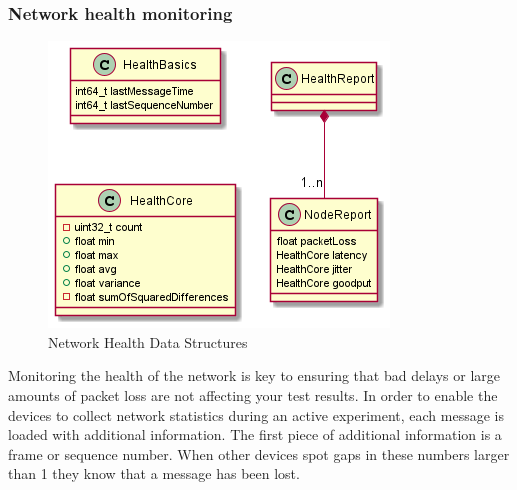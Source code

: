 \documentclass[letterpaper,twocolumn,12pt]{article}
\begin{document}
\subsubsection{Network health monitoring}\label{sec:nethealth}
\begin{figure}[]
    \centering
    \includegraphics[width=\linewidth]{out/images/network_health/network_health.png}
    \caption{Network Health Data Structures}
    \label{fig:network_health_ds}
\end{figure}
Monitoring the health of the network is key to ensuring that bad delays or large amounts of packet loss are not affecting your test results. In order to enable the devices to collect network statistics during an active experiment, each message is loaded with additional information. The first piece of additional information is a frame or sequence number. When other devices spot gaps in these numbers larger than 1 they know that a message has been lost.
\end{document}
